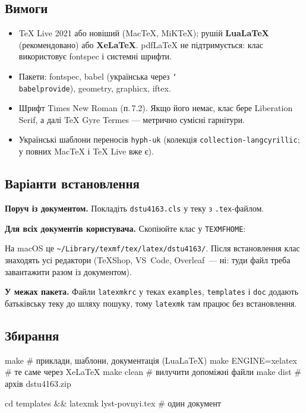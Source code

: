 \documentclass[11pt,a4paper]{article}
\newcommand\pkg[1]{\textsf{#1}}
\newcommand\cs[1]{\texttt{\char`\\#1}}
\newcommand\cl[1]{п.\,#1}
\begin{document}
\subsection{Вимоги}

\begin{itemize}
  \item TeX Live 2021 або новіший (MacTeX, MiKTeX); рушій \textbf{LuaLaTeX}
        (рекомендовано) або \textbf{XeLaTeX}. pdf\LaTeX{} не підтримується:
        клас використовує \pkg{fontspec} і системні шрифти.
  \item Пакети: \pkg{fontspec}, \pkg{babel} (українська через
        \cs{babelprovide}), \pkg{geometry}, \pkg{graphicx}, \pkg{iftex}.
  \item Шрифт Times New Roman (\cl{7.2}). Якщо його немає, клас бере
        Liberation Serif, а далі TeX Gyre Termes — метрично сумісні гарнітури.
  \item Українські шаблони переносів \texttt{hyph-uk} (колекція
        \texttt{collection-langcyrillic}; у повних MacTeX і TeX Live вже є).
\end{itemize}

\subsection{Варіанти встановлення}

\textbf{Поруч із документом.} Покладіть \texttt{dstu4163.cls} у теку з
\texttt{.tex}-файлом.

\textbf{Для всіх документів користувача.} Скопіюйте клас у \texttt{TEXMFHOME}:
На macOS це \texttt{\textasciitilde/Library/texmf/tex/latex/dstu4163/}. Після
встановлення клас знаходять усі редактори (TeXShop, VS~Code, Overleaf~— ні:
туди файл треба завантажити разом із документом).

\textbf{У межах пакета.} Файли \texttt{latexmkrc} у теках \texttt{examples},
\texttt{templates} і \texttt{doc} додають батьківську теку до шляху пошуку,
тому \texttt{latexmk} там працює без встановлення.

\subsection{Збирання}

\begin{code}
make                # приклади, шаблони, документація (LuaLaTeX)
make ENGINE=xelatex # те саме через XeLaTeX
make clean          # вилучити допоміжні файли
make dist           # архів dstu4163.zip

cd templates && latexmk lyst-povnyi.tex        # один документ
\end{code}
\end{document}
